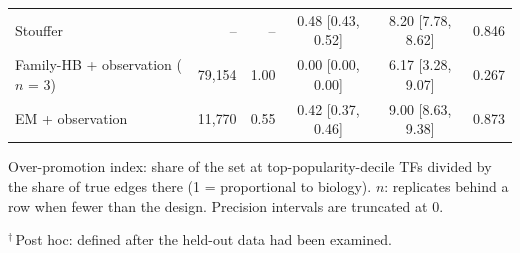 \begin{table}[htbp]
\begin{tabular}{@{}lrrccc@{}}
Stouffer & -- & -- & 0.48 [0.43, 0.52] & 8.20 [7.78, 8.62] & 0.846 \\
Family-HB + observation ($n$ = 3) & 79{,}154 & 1.00 & 0.00 [0.00, 0.00] & 6.17 [3.28, 9.07] & 0.267 \\
EM + observation & 11{,}770 & 0.55 & 0.42 [0.37, 0.46] & 9.00 [8.63, 9.38] & 0.873 \\
\bottomrule
\end{tabular}
\par\smallskip
\begin{minipage}{\linewidth}\footnotesize
Over-promotion index: share of the set at top-popularity-decile TFs divided by the share of true edges there (1 = proportional to biology). $n$: replicates behind a row when fewer than the design. Precision intervals are truncated at 0.

$^{\dagger}$\,Post hoc: defined after the held-out data had been examined.
\end{minipage}
\end{table}
